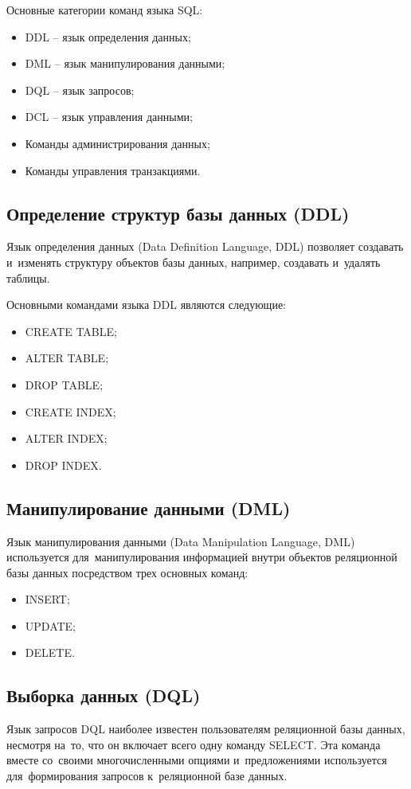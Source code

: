 \documentclass{ou}
\begin{document}
Основные категории команд языка SQL:
\begin{itemize}[label=-, leftmargin=0em, itemindent=3.35em, nosep]
\item DDL -- язык определения данных;
\item DML -- язык манипулирования данными;
\item DQL -- язык запросов;
\item DCL -- язык управления данными;
\item Команды администрирования данных;
\item Команды управления транзакциями.
\end{itemize}

\subsection{Определение структур базы данных (DDL)}
Язык определения данных (Data Definition Language, DDL) позволяет создавать и~изменять структуру объектов базы данных, например, создавать и~удалять таблицы.

Основными командами языка DDL являются следующие:

\begin{itemize}[label=-, leftmargin=0em, itemindent=3.35em, nosep]
\item CREATE TABLE;
\item ALTER TABLE;
\item DROP TABLE;
\item CREATE INDEX;
\item ALTER INDEX;
\item DROP INDEX.
\end{itemize}

\subsection{Манипулирование данными (DML)}
Язык манипулирования данными (Data Manipulation Language, DML) используется для~манипулирования информацией внутри объектов реляционной базы данных посредством трех основных команд:

\begin{itemize}[label=-, leftmargin=0em, itemindent=3.35em, nosep]
\item INSERT;
\item UPDATE;
\item DELETE.
\end{itemize}

\subsection{Выборка данных (DQL)}
Язык запросов DQL наиболее известен пользователям реляционной базы данных, несмотря на~то, что он включает всего одну команду SELECT. Эта команда вместе со~своими многочисленными опциями и~предложениями используется для~формирования запросов к~реляционной базе данных.
\end{document}
